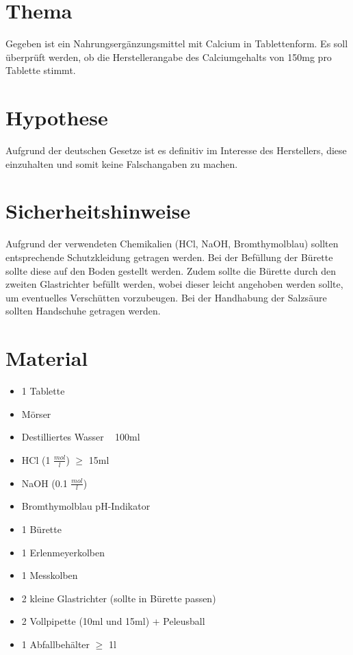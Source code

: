 \documentclass[8pt, letterpaper]{article}
\newcommand{\mpl}[1]{#1 \(\frac{mol}{l}\)}
\begin{document}
\section{Thema}
Gegeben ist ein Nahrungsergänzungsmittel mit Calcium in Tablettenform.
Es soll überprüft werden, ob die Herstellerangabe des Calciumgehalts von 150mg pro Tablette stimmt.

\section{Hypothese}
Aufgrund der deutschen Gesetze ist es definitiv im Interesse des Herstellers, diese einzuhalten und somit keine Falschangaben zu machen.

\section{Sicherheitshinweise}
Aufgrund der verwendeten Chemikalien (HCl, NaOH, Bromthymolblau) sollten entsprechende Schutzkleidung getragen werden.
Bei der Befüllung der Bürette sollte diese auf den Boden gestellt werden. Zudem sollte die Bürette durch den zweiten Glastrichter befüllt werden, wobei dieser leicht angehoben werden sollte, um eventuelles Verschütten vorzubeugen.
Bei der Handhabung der Salzsäure sollten Handschuhe getragen werden.

\section{Material}
\begin{itemize}
    \item 1 Tablette
    \item Mörser
    \item Destilliertes Wasser ~ 100ml
    \item HCl (\mpl{1}) \(\ge\) 15ml
    \item NaOH (\mpl{0.1})
    \item Bromthymolblau pH-Indikator
    \item 1 Bürette
    \item 1 Erlenmeyerkolben
    \item 1 Messkolben
    \item 2 kleine Glastrichter (sollte in Bürette passen)
    \item 2 Vollpipette (10ml und 15ml) + Peleusball
    \item 1 Abfallbehälter \(\ge\) 1l
\end{itemize}
\end{document}
